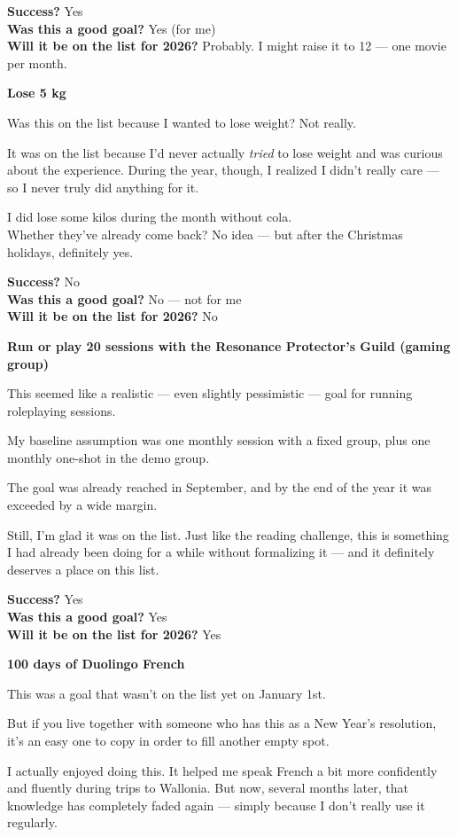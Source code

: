 \documentclass[12pt]{article}
\begin{document}
\textbf{Success?} Yes\\
\textbf{Was this a good goal?} Yes (for me)\\
\textbf{Will it be on the list for 2026?} Probably. I might raise it to
12 --- one movie per month.

\textbf{Lose 5 kg}

Was this on the list because I wanted to lose weight? Not really.

It was on the list because I'd never actually \emph{tried} to lose
weight and was curious about the experience. During the year, though, I
realized I didn't really care --- so I never truly did anything for it.

I did lose some kilos during the month without cola.\\
Whether they've already come back? No idea --- but after the Christmas
holidays, definitely yes.

\textbf{Success?} No\\
\textbf{Was this a good goal?} No --- not for me\\
\textbf{Will it be on the list for 2026?} No

\textbf{Run or play 20 sessions with the Resonance Protector's Guild
(gaming group)}

This seemed like a realistic --- even slightly pessimistic --- goal for
running roleplaying sessions.

My baseline assumption was one monthly session with a fixed group, plus
one monthly one-shot in the demo group.

The goal was already reached in September, and by the end of the year it
was exceeded by a wide margin.

Still, I'm glad it was on the list. Just like the reading challenge,
this is something I had already been doing for a while without
formalizing it --- and it definitely deserves a place on this list.

\textbf{Success?} Yes\\
\textbf{Was this a good goal?} Yes\\
\textbf{Will it be on the list for 2026?} Yes

\textbf{100 days of Duolingo French}

This was a goal that wasn't on the list yet on January 1st.

But if you live together with someone who has this as a New Year's
resolution, it's an easy one to copy in order to fill another empty
spot.

I actually enjoyed doing this. It helped me speak French a bit more
confidently and fluently during trips to Wallonia. But now, several
months later, that knowledge has completely faded again --- simply
because I don't really use it regularly.
\end{document}
